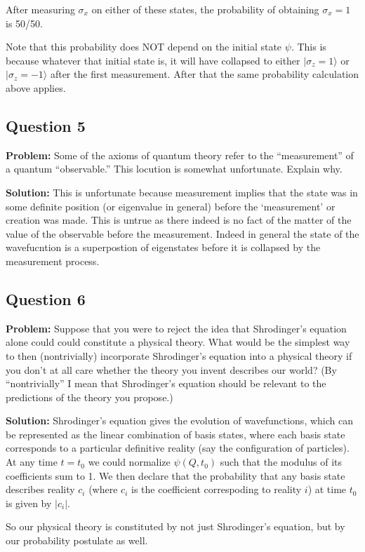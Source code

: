 \documentclass{article}
\begin{document}
After measuring $\sigma_x$ on either of these states, the probability of obtaining $\sigma_x=1$ is 50/50.

Note that this probability does NOT depend on the initial state $\psi$. This is because whatever that initial state is, it will have collapsed to either $|\sigma_z=1\rangle$ or $|\sigma_z=-1\rangle$ after the first measurement. After that the same probability calculation above applies.

\subsection*{Question 5}
\noindent\textbf{Problem:} Some of the axioms of quantum theory refer to the ``measurement'' of a quantum ``observable.'' This locution is somewhat unfortunate. Explain why.
\bigskip

\noindent\textbf{Solution:} This is unfortunate because measurement implies that the state was in some definite position (or eigenvalue in general) before the `measurement' or creation was made. This is untrue as there indeed is no fact of the matter of the value of the observable before the measurement. Indeed in general the state of the wavefucntion is a superpostion of eigenstates before it is collapsed by the measurement process.


\subsection*{Question 6}
\noindent\textbf{Problem:} Suppose that you were to reject the idea that Shrodinger's equation alone could could constitute a physical theory. What would be the simplest way to then (nontrivially) incorporate Shrodinger's equation into a physical theory if you don't at all care whether the theory you invent describes our world? (By ``nontrivially'' I mean that Shrodinger's equation should be relevant to the predictions of the theory you propose.)
\bigskip

\noindent\textbf{Solution:} Shrodinger's equation gives the evolution of wavefunctions, which can be represented as the linear combination of basis states, where each basis state corresponds to a particular definitive reality (say the configuration of particles). At any time $t=t_0$ we could normalize $\psi(Q,t_0)$ such that the modulus of its coefficients sum to 1. We then declare that the probability that any basis state describes reality $c_i$ (where $c_i$ is the coefficient correspoding to reality $i$) at time $t_0$ is given by $|c_i|$.

So our physical theory is constituted by not just Shrodinger's equation, but by our probability postulate as well.
\end{document}
